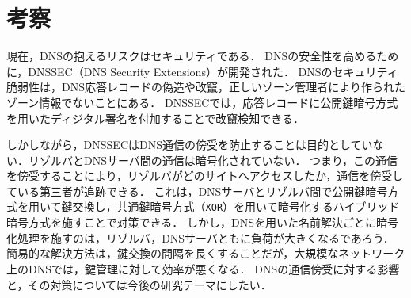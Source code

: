\section{考察}
現在，DNSの抱えるリスクはセキュリティである．
DNSの安全性を高めるために，DNSSEC（DNS Security Extensions）が開発された．
DNSのセキュリティ脆弱性は，DNS応答レコードの偽造や改竄，正しいゾーン管理者により作られたゾーン情報でないことにある．
DNSSECでは，応答レコードに公開鍵暗号方式を用いたディジタル署名を付加することで改竄検知できる．\par
しかしながら，DNSSECはDNS通信の傍受を防止することは目的としていない．リゾルバとDNSサーバ間の通信は暗号化されていない\cite{weko_75812_1}．
つまり，この通信を傍受することにより，リゾルバがどのサイトへアクセスしたか，通信を傍受している第三者が追跡できる．
これは，DNSサーバとリゾルバ間で公開鍵暗号方式を用いて鍵交換し，共通鍵暗号方式（\texttt{XOR}）を用いて暗号化するハイブリッド暗号方式を施すことで対策できる．
しかし，DNSを用いた名前解決ごとに暗号化処理を施すのは，リゾルバ，DNSサーバともに負荷が大きくなるであろう．
簡易的な解決方法は，鍵交換の間隔を長くすることだが，大規模なネットワーク上のDNSでは，鍵管理に対して効率が悪くなる．
DNSの通信傍受に対する影響と，その対策については今後の研究テーマにしたい．